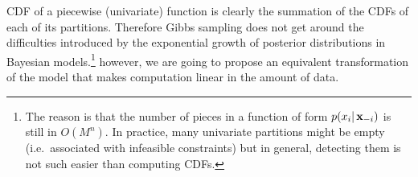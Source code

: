 CDF of a piecewise (univariate) function is clearly the summation of the CDFs of each of its partitions.
Therefore Gibbs sampling does not get around the difficulties introduced by the exponential growth of posterior distributions in Bayesian models.\footnote{
The reason is that the number of pieces in a function of form $p(x_i |\, \textbf{x}_{-i})$ is still in $O(M^n)$. 
In practice, many univariate partitions might be empty (i.e.\ associated with infeasible constraints) but in general, detecting them is not such easier than computing CDFs.
} %
however,  we are going to propose an equivalent transformation of the model that makes computation linear in the amount of data.
